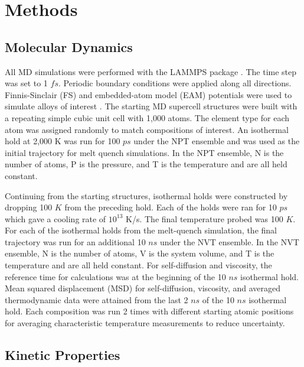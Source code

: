 \documentclass[11pt,a4paper]{article}                                %
\begin{document}
\section{Methods}

\subsection{Molecular Dynamics}

\par
All MD simulations were performed with the LAMMPS package \cite{Plimpton1995}. The time step was set to 1 $fs$. Periodic boundary conditions were applied along all directions. Finnis-Sinclair (FS) and embedded-atom model (EAM) potentials were used to simulate alloys of interest \cite{Becker2013, Cheng2009, Cheng2008, Fujita2010, Hale2018, Li2019, Sheng2011}. The starting MD supercell structures were built with a repeating simple cubic unit cell with 1,000 atoms. The element type for each atom was assigned randomly to match compositions of interest. An isothermal hold at 2,000 K was run for 100 $ps$ under the NPT ensemble and was used as the initial trajectory for melt quench simulations. In the NPT ensemble, N is the number of atoms, P is the pressure, and T is the temperature and are all held constant.

\par
Continuing from the starting structures, isothermal holds were constructed by dropping 100 $K$ from the preceding hold. Each of the holds were ran for 10 $ps$ which gave a cooling rate of $10^{13}$ K/s. The final temperature probed was 100 $K$. For each of the isothermal holds from the melt-quench simulation, the final trajectory was run for an additional 10 $ns$ under the NVT ensemble. In the NVT ensemble, N is the number of atoms, V is the system volume, and T is the temperature and are all held constant. For self-diffusion and viscosity, the reference time for calculations was at the beginning of the 10 $ns$ isothermal hold. Mean squared displacement (MSD) for self-diffusion, viscosity, and averaged thermodynamic data were attained from the last 2 $ns$ of the 10 $ns$ isothermal hold. Each composition was run 2 times with different starting atomic positions for averaging characteristic temperature measurements to reduce uncertainty.

\subsection{Kinetic Properties}
\end{document}
